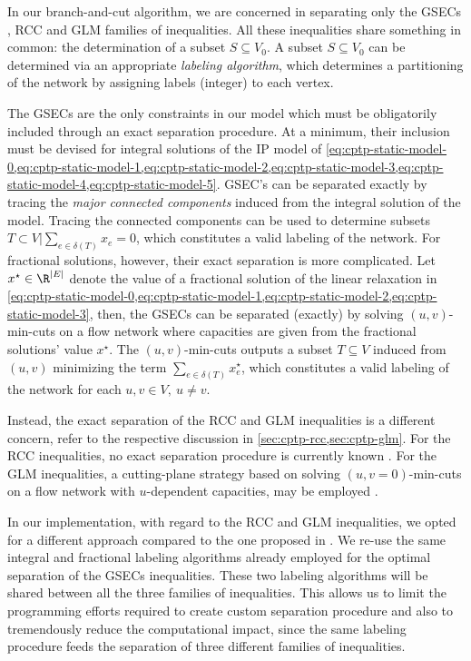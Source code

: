 In our branch-and-cut algorithm,
we are concerned in separating only the
GSECs ,
RCC 
and GLM 
families of inequalities.
All these inequalities share something in common:
the determination of a subset $S \subseteq V_0$.
A subset $S \subseteq V_0$ can be determined via an appropriate \textit{labeling algorithm},
which determines a partitioning of the network by assigning labels (integer) to each vertex.

The GSECs are the only constraints in our model which must be obligatorily
included through an exact separation procedure.
At a minimum, their inclusion must be devised
for integral solutions of the IP model of
\cref{eq:cptp-static-model-0,eq:cptp-static-model-1,eq:cptp-static-model-2,eq:cptp-static-model-3,eq:cptp-static-model-4,eq:cptp-static-model-5}.
GSEC's can be separated exactly
by tracing the \textit{major connected components}
induced from the integral solution of the model.
Tracing the connected components can be used to determine subsets
$T \subset V | \sum_{e \in \delta(T)} x_e = 0$,
which constitutes a valid labeling of the network.
For fractional solutions, however, their exact separation is more complicated.
Let $x^\star \in \R^{|E|}$ denote the value of a fractional solution of
the linear relaxation in
\cref{eq:cptp-static-model-0,eq:cptp-static-model-1,eq:cptp-static-model-2,eq:cptp-static-model-3},
then,
the GSECs can be separated (exactly) by solving $(u, v)$-min-cuts
on a flow network where capacities are given from the fractional solutions' value $x^\star$.
The $(u, v)$-min-cuts outputs a subset $T \subseteq V$ induced from $(u, v)$
minimizing the term $\sum_{e \in \delta(T)} x^\star_e$,
which constitutes a valid labeling of the network for each $u, v \in V,\ u \ne v$.

Instead, the exact separation of the RCC and GLM inequalities
is a different concern, refer to the respective discussion in \cref{sec:cptp-rcc,sec:cptp-glm}.
For the RCC inequalities,
no exact separation procedure is currently known \parencite{jepsen2014}.
For the GLM inequalities,
a cutting-plane strategy based on solving
$(u, v=0)$-min-cuts on a flow network with $u$-dependent capacities,
may be employed \parencite{letchford2006, jepsen2014}.

\medskip

In our implementation, with regard to the RCC and GLM inequalities,
we opted for a different approach compared to the one proposed in \textcite{jepsen2014}.
We re-use the same integral and fractional labeling algorithms
already employed for the optimal separation of the GSECs inequalities.
These two labeling algorithms will be shared between all the three families of inequalities.
This allows us to limit the programming efforts required to create custom
separation procedure
and also to tremendously reduce the computational impact,
since the same labeling procedure feeds the separation of three different families of inequalities.

